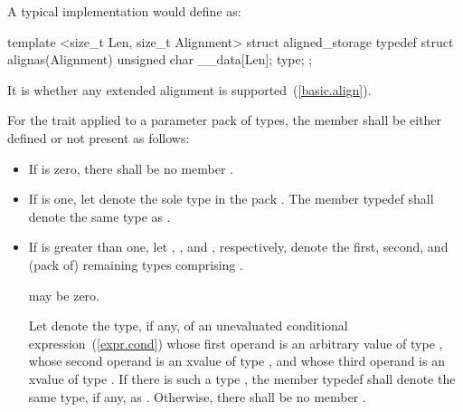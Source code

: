 %
\pnum
\begin{note} A typical implementation would define  as:

\begin{codeblock}
template <size_t Len, size_t Alignment>
struct aligned_storage {
  typedef struct {
    alignas(Alignment) unsigned char __data[Len];
  } type;
};
\end{codeblock}
\end{note}

\pnum
It is  whether any extended alignment is
supported~(\ref{basic.align}).

%
\pnum
For the  trait applied to a parameter pack  of types,
the member  shall be either defined or not present as follows:

\begin{itemize}
\item If  is zero, there shall be no member .

\item If  is one, let  denote the sole type
in the pack . The member typedef  shall denote the same
type as .

\item If  is greater than one,
let , , and , respectively,
denote the first, second, and (pack of) remaining types comprising .
\begin{note}  may be zero. \end{note}
Let  denote the type, if any,
of an unevaluated conditional expression~(\ref{expr.cond})
whose first operand is an arbitrary value of type ,
whose second operand is an xvalue of type , and
whose third operand is an xvalue of type .
If there is such a type , the member typedef 
shall denote the same type, if any, as .
Otherwise, there shall be no member .
\end{itemize}


